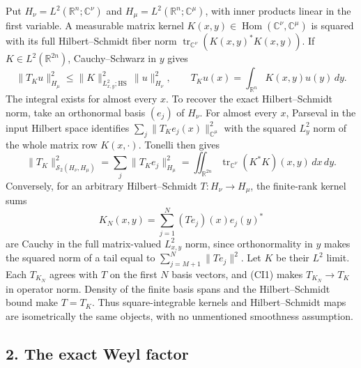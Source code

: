 \documentclass[
  11pt,
]{article}
\begin{document}
Put \(H_\nu=L^2(\mathbb R^n;\mathbb C^\nu)\) and
\(H_\mu=L^2(\mathbb R^n;\mathbb C^\mu)\), with inner products linear in
the first variable. A measurable matrix kernel
\(K(x,y)\in\operatorname{Hom}(\mathbb C^\nu,\mathbb C^\mu)\) is squared
with its full Hilbert--Schmidt fiber norm
\(\operatorname{tr}_{\mathbb C^\nu}(K(x,y)^*K(x,y))\). If
\(K\in L^2(\mathbb R^{2n})\), Cauchy--Schwarz in \(y\) gives \[
 \|T_Ku\|_{H_\mu}^2
 \leq \|K\|_{L^2_{x,y};\mathrm{HS}}^2\,\|u\|_{H_\nu}^2,\qquad
 T_Ku(x)=\int_{\mathbb R^n}K(x,y)u(y)\,dy .
 \tag{CI1}
\] The integral exists for almost every \(x\). To recover the exact
Hilbert--Schmidt norm, take an orthonormal basis \((e_j)\) of \(H_\nu\).
For almost every \(x\), Parseval in the input Hilbert space identifies
\(\sum_j\|T_Ke_j(x)\|_{\mathbb C^\mu}^2\) with the squared \(L^2_y\)
norm of the whole matrix row \(K(x,\cdot)\). Tonelli then gives \[
 \|T_K\|_{\mathcal S_2(H_\nu,H_\mu)}^2
   =\sum_j\|T_Ke_j\|_{H_\mu}^2
   =\iint_{\mathbb R^{2n}}
       \operatorname{tr}_{\mathbb C^\nu}(K^*K)(x,y)\,dx\,dy.
 \tag{CI2}
\] Conversely, for an arbitrary Hilbert--Schmidt \(T:H_\nu\to H_\mu\),
the finite-rank kernel sums \[
 K_N(x,y)=\sum_{j=1}^N(Te_j)(x)e_j(y)^*
 \tag{CI3}
\] are Cauchy in the full matrix-valued \(L^2_{x,y}\) norm, since
orthonormality in \(y\) makes the squared norm of a tail equal to
\(\sum_{j=M+1}^N\|Te_j\|^2\). Let \(K\) be their \(L^2\) limit. Each
\(T_{K_N}\) agrees with \(T\) on the first \(N\) basis vectors, and
(CI1) makes \(T_{K_N}\to T_K\) in operator norm. Density of the finite
basis spans and the Hilbert--Schmidt bound make \(T=T_K\). Thus
square-integrable kernels and Hilbert--Schmidt maps are isometrically
the same objects, with no unmentioned smoothness assumption.

\subsection{2. The exact Weyl factor}\label{the-exact-weyl-factor}
\end{document}
